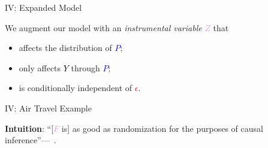 \documentclass[xcolor={dvipsnames}]{beamer}
\newcommand{\policy}{\mbox{\textcolor{blue}{$P$}}}
\newcommand{\response}{\mbox{\textcolor{black}{$Y$}}}
\newcommand{\confounder}{\mbox{\textcolor{red}{$\epsilon$}}}
\newcommand{\instrument}{\mbox{\textcolor{Plum}{$Z$}}}
\begin{document}
    \begin{frame}{IV: Expanded Model}

        \begin{figure}
            \centering
            
        \end{figure}

        We augment our model with an \emph{instrumental variable} \instrument{} that
        \begin{itemize}
            \item affects the distribution of \policy{};
            \item only affects \response{} through \policy{};
            \item is conditionally independent of \confounder{}.
        \end{itemize}

    \end{frame}

    \begin{frame}{IV: Air Travel Example}

        \begin{figure}
            \centering
            
        \end{figure}

        \textbf{Intuition}: ``[\textcolor{Plum}{$F$} is] as good as randomization for the purposes of causal inference''---~\citet{hartford2017deep}.

    \end{frame}
\end{document}
